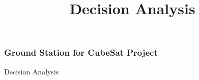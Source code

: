 

\title[Systems Engineering]{ Decision Analysis} 





\newpage
\begin{frame}
\frametitle{Ground Station for CubeSat Project }
\begin{block}{Decision Analysis}


 
\end{block}
\end{frame}
